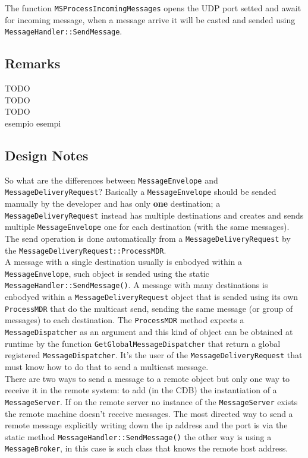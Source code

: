 The function \texttt{MSProcessIncomingMessages} opens the UDP port setted and await for incoming message, when a message arrive it will be casted and sended using \texttt{MessageHandler::SendMessage}.



\subsection{Remarks}
TODO\\
TODO\\
TODO\\
esempio esempi



\subsection{Design Notes}

So what are the differences between \texttt{MessageEnvelope} and \texttt{MessageDeliveryRequest}? Basically a \texttt{MessageEnvelope} should be sended manually by the developer and has only \textbf{one} destination; a \texttt{MessageDeliveryRequest} instead has multiple destinations and creates and sends multiple \texttt{MessageEnvelope} one for each destination (with the same messages). The send operation is done automatically from a \texttt{MessageDeliveryRequest} by the \texttt{MessageDeliveryRequest::ProcessMDR}.\\


A message with a single destination usually is enbodyed within a \texttt{MessageEnvelope}, such object is sended using the static \texttt{MessageHandler::SendMessage()}. A message with many destinations is enbodyed within a \texttt{MessageDeliveryRequest} object that is sended using its own \texttt{ProcessMDR} that do the multicast send, sending the same message (or group of messages) to each destination. The \texttt{ProcessMDR} method expects a \texttt{MessageDispatcher} as an argument and this kind of object can be obtained at runtime by the function \texttt{GetGlobalMessageDispatcher} that return a global registered \texttt{MessageDispatcher}. It's the user of the \texttt{MessageDeliveryRequest} that must know how to do that to send a multicast message. \\


There are two ways to send a message to a remote object but only one way to receive it in the remote system: to add (in the CDB) the instantiation of a \texttt{MessageServer}. If on the remote server no instance of the \texttt{MessageServer} exists the remote machine doesn't receive messages.
The most directed way to send a remote message explicitly writing down the ip address and the port is via the static method \texttt{MessageHandler::SendMessage()} the other way is using a \texttt{MessageBroker}, in this case is such class that knows the remote host address.



